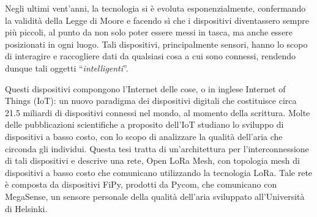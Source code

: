 
Negli ultimi vent'anni, la tecnologia si è evoluta esponenzialmente, confermando la validità della Legge di Moore e facendo sì che i dispositivi diventassero sempre più piccoli, al punto da non solo poter essere messi in tasca, ma anche essere posizionati in ogni luogo.
Tali dispositivi, principalmente sensori, hanno lo scopo di interagire e raccogliere dati da qualsiasi cosa a cui sono connessi, rendendo dunque tali oggetti ``\textit{intelligenti}''.

Questi dispositivi compongono l'Internet delle cose, o in inglese Internet of Things (IoT): un nuovo paradigma dei dispositivi digitali che costituisce circa 21.5 miliardi di dispositivi connessi nel mondo, al momento della scrittura.
Molte delle pubblicazioni scientifiche a proposito dell'IoT studiano lo sviluppo di dispositivi a basso costo, con lo scopo di analizzare la qualità dell'aria che circonda gli individui.
Questa tesi tratta di un'architettura per l'interconnessione di tali dispositivi e descrive una rete, Open LoRa Mesh, con topologia mesh di dispositivi a basso costo che comunicano utilizzando la tecnologia LoRa.
Tale rete è composta da dispositivi FiPy, prodotti da Pycom, che comunicano con MegaSense, un sensore personale della qualità dell'aria sviluppato all'Università di Helsinki.